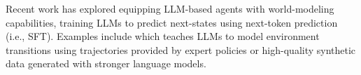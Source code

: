 \documentclass{article}
\theoremstyle{plain}
\theoremstyle{definition}
\theoremstyle{remark}
\newcommand{\ie}{i.e.,}
\begin{document}
Recent work has explored equipping LLM-based agents with world-modeling capabilities, training LLMs to predict next-states using next-token prediction (\ie{} SFT).
Examples include \citet{zhang2025agentlearningearlyexperience,yu2025dynathinksynergizingreasoningacting} which teaches LLMs to model environment transitions using trajectories provided by expert policies or high-quality synthetic data generated with stronger language models.
\end{document}
